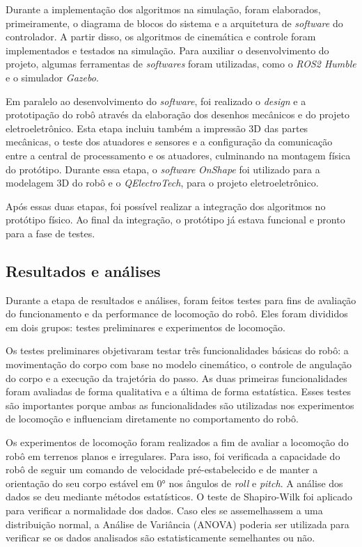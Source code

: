 \documentclass[conference]{IEEEtran}
\begin{document}
  Durante a implementação dos algoritmos na simulação, foram elaborados, primeiramente, o diagrama de blocos do sistema e a arquitetura de \textit{software} do controlador. A partir disso, os algoritmos de cinemática e controle foram implementados e testados na simulação. Para auxiliar o desenvolvimento do projeto, algumas ferramentas de \textit{softwares} foram utilizadas, como o \textit{ROS2 Humble} e o simulador \textit{Gazebo}.

  Em paralelo ao desenvolvimento do \textit{software}, foi realizado o \textit{design} e a prototipação do robô através da elaboração dos desenhos mecânicos e do projeto eletroeletrônico. Esta etapa incluiu também a impressão 3D das partes mecânicas, o teste dos atuadores e sensores e a configuração da comunicação entre a central de processamento e os atuadores, culminando na montagem física do protótipo. Durante essa etapa, o \textit{software} \textit{OnShape} foi utilizado para a modelagem 3D do robô e o \textit{QElectroTech}, para o projeto eletroeletrônico.

  Após essas duas etapas, foi possível realizar a integração dos algoritmos no protótipo físico. Ao final da integração, o protótipo já estava funcional e pronto para a fase de testes.

  \subsection{Resultados e análises}
  \label{sec:method_results_analysis}
  Durante a etapa de resultados e análises, foram feitos testes para fins de avaliação do funcionamento e da performance de locomoção do robô. Eles foram divididos em dois grupos: testes preliminares e experimentos de locomoção. 
  
  Os testes preliminares objetivaram testar três funcionalidades básicas do robô: a movimentação do corpo com base no modelo cinemático, o controle de angulação do corpo e a execução da trajetória do passo. As duas primeiras funcionalidades foram avaliadas de forma qualitativa e a última de forma estatística. Esses testes são importantes porque ambas as funcionalidades são utilizadas nos experimentos de locomoção e influenciam diretamente no comportamento do robô. 

  Os experimentos de locomoção foram realizados a fim de avaliar a locomoção do robô em terrenos planos e irregulares. Para isso, foi verificada a capacidade do robô de seguir um comando de velocidade pré-estabelecido e de manter a orientação do seu corpo estável em $0°$ nos ângulos de \textit{roll} e \textit{pitch}. A análise dos dados se deu mediante métodos estatísticos. O teste de Shapiro-Wilk \cite{leotti2005comparaccao} foi aplicado para verificar a normalidade dos dados. Caso eles se assemelhassem a uma distribuição normal, a Análise de Variância (ANOVA) \cite{cano2012six} poderia ser utilizada para verificar se os dados analisados são estatisticamente semelhantes ou não.
\end{document}
